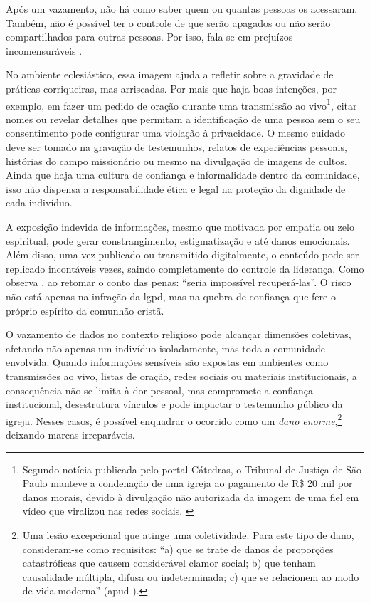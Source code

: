 \begin{citacao}
Após um vazamento, não há como saber quem ou quantas pessoas os acessaram. Também, não é possível ter o controle de que serão apagados ou não serão compartilhados para outras pessoas. Por isso, fala-se em prejuízos incomensuráveis \cite{migalhas2023}.
\end{citacao}

No ambiente eclesiástico, essa imagem ajuda a refletir sobre a gravidade de práticas corriqueiras, mas arriscadas. Por mais que haja boas intenções, por exemplo, em fazer um pedido de oração durante uma transmissão ao vivo\footnote{Segundo notícia publicada pelo portal Cátedras, o Tribunal de Justiça de São Paulo manteve a condenação de uma igreja ao pagamento de R\$ 20 mil por danos morais, devido à divulgação não autorizada da imagem de uma fiel em vídeo que viralizou nas redes sociais. \cite{catedras2024}}, citar nomes ou revelar detalhes que permitam a identificação de uma pessoa sem o seu consentimento pode configurar uma violação à privacidade. O mesmo cuidado deve ser tomado na gravação de testemunhos, relatos de experiências pessoais, histórias do campo missionário ou mesmo na divulgação de imagens de cultos. Ainda que haja uma cultura de confiança e informalidade dentro da comunidade, isso não dispensa a responsabilidade ética e legal na proteção da dignidade de cada indivíduo.

A exposição indevida de informações, mesmo que motivada por empatia ou zelo espiritual, pode gerar constrangimento, estigmatização e até danos emocionais. Além disso, uma vez publicado ou transmitido digitalmente, o conteúdo pode ser replicado incontáveis vezes, saindo completamente do controle da liderança. Como observa , ao retomar o conto das penas: ``seria impossível recuperá-las''. O risco não está apenas na infração da \gls{lgpd}, mas na quebra de confiança que fere o próprio espírito da comunhão cristã.

O vazamento de dados no contexto religioso pode alcançar dimensões coletivas, afetando não apenas um indivíduo isoladamente, mas toda a comunidade envolvida. Quando informações sensíveis são expostas em ambientes como transmissões ao vivo, listas de oração, redes sociais ou materiais institucionais, a consequência não se limita à dor pessoal, mas compromete a confiança institucional, desestrutura vínculos e pode impactar o testemunho público da igreja. Nesses casos, é possível enquadrar o ocorrido como um \textit{dano enorme},\footnote{Uma lesão excepcional que atinge uma coletividade. Para este tipo de dano, consideram-se como requisitos: ``a) que se trate de danos de proporções catastróficas que causem considerável clamor social; b) que tenham causalidade múltipla, difusa ou indeterminada; c) que se relacionem ao modo de vida moderna'' (apud ).} deixando marcas irreparáveis.

